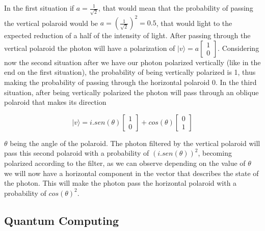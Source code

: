 In the first situation if $a = \frac{1}{\sqrt{2}}$, that would mean that the probability of passing the vertical polaroid would be $a = (\frac{1}{\sqrt{2}})^{2} = 0.5$, that would light to the expected reduction of a half of the intensity of light. After passing through the vertical polaroid the photon will have a polarization of $\vert v \rangle = a\left[\begin{array}{c}
1\\
0
\end{array}\right]$. Considering now the second situation after we have our photon polarized vertically (like in the end on the first situation), the probability of being vertically polarized is 1, thus making the probability of passing through the horizontal polaroid 0.
In the third situation, after being vertically polarized the photon will pass through an oblique polaroid that makes its direction

\begin{equation}
\vert v \rangle = i.sen(\theta) \left[\begin{array}{c}
1\\
0
\end{array}\right]+ cos(\theta)\left[\begin{array}{c}
0\\
1
\end{array}\right]
\end{equation}



$\theta$ being the angle of the polaroid. The photon filtered by the vertical polaroid will pass this second polaroid with a probability of $(i.sen(\theta))^{2}$, becoming polarized according to the filter, as we can observe depending on the value of $\theta$ we will now have a horizontal component in the vector that describes the state of the photon. This will make the photon pass the horizontal polaroid  with a probability of $cos(\theta)^{2}$. 




\subsection{Quantum Computing}
\label{subsec:int_quantum_computing}





